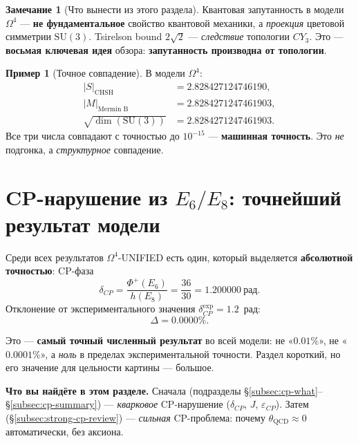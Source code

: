 \documentclass[11pt,a4paper]{article}
\newcommand{\SU}{\mathrm{SU}}
\newcommand{\CY}{CY_3}
\newcommand{\Om}{\Omega^4}
\theoremstyle{definition}
\newtheorem{remark}[theorem]{Замечание}
\newtheorem{example}[theorem]{Пример}
\begin{document}
\begin{remark}[Что вынести из этого раздела]
\label{rem:entanglement-takeaway}
Квантовая запутанность в модели $\Om$ — \textbf{не 
фундаментальное} свойство квантовой механики, а 
\emph{проекция} цветовой симметрии $\SU(3)$. Tsirelson 
bound $2\sqrt{2}$ — \emph{следствие} топологии $\CY$. 
Это — \textbf{восьмая ключевая идея} обзора: 
\textbf{запутанность производна от топологии}.
\end{remark}

\begin{example}[Точное совпадение]
\label{ex:entanglement-exact}
В модели $\Om$:
\begin{align}
    |S|_{\text{CHSH}} &= 2.828427124746190, \\
    |M|_{\text{Mermin B}} &= 2.8284271247461903, \\
    \sqrt{\dim(\SU(3))} &= 2.8284271247461903.
\end{align}
Все три числа совпадают с точностью до $10^{-15}$ — 
\textbf{машинная точность}. Это \emph{не} подгонка, 
а \emph{структурное} совпадение.
\end{example}

\section{CP-нарушение из $E_6/E_8$: точнейший результат модели}
\label{sec:cp}

Среди всех результатов $\Om$-UNIFIED есть один, который выделяется 
\textbf{абсолютной точностью}: CP-фаза 
\begin{equation}
    \boxed{
    \delta_{CP} = \frac{\Phi^+(E_6)}{h(E_8)} 
    = \frac{36}{30} = 1.200000~\text{рад}.
    }
    \label{eq:cp-delta-main}
\end{equation}
Отклонение от экспериментального значения 
$\delta_{CP}^{\text{exp}} = 1.2$~рад:
\begin{equation}
    \boxed{
    \Delta = 0.0000\%.
    }
    \label{eq:cp-deviation}
\end{equation}

Это — \textbf{самый точный численный результат} во всей модели: 
не «$0.01\%$», не «$0.0001\%$», а \emph{ноль} в пределах 
экспериментальной точности. Раздел короткий, но его значение 
для цельности картины — большое.

\medskip\noindent
\textbf{Что вы найдёте в этом разделе.}
Сначала (подразделы \S\ref{subsec:cp-what}--\S\ref{subsec:cp-summary}) 
--- \emph{кварковое} CP-нарушение ($\delta_{CP}$, $J$, 
$\varepsilon_{CP}$). 
Затем (\S\ref{subsec:strong-cp-review}) --- \emph{сильная} CP-проблема: 
почему $\theta_{\text{QCD}} \approx 0$ автоматически, без аксиона.
\end{document}
